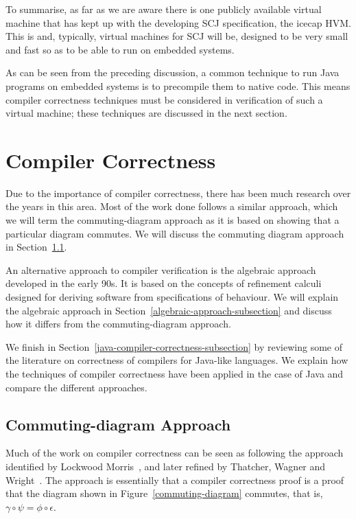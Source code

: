 \documentclass[a4paper,10pt]{report}
\begin{document}
To summarise, as far as we are aware there is one publicly available
virtual machine that has kept up with the developing SCJ
specification, the icecap HVM.
This is and, typically, virtual machines for SCJ will be, designed to
be very small and fast so as to be able to run on embedded systems.

As can be seen from the preceding discussion, a common technique to
run Java programs on embedded systems is to precompile them to native
code.
This means compiler correctness techniques must be considered in
verification of such a virtual machine; these techniques are discussed
in the next section.

\section{Compiler Correctness}
\label{compiler-correctness-section}

Due to the importance of compiler correctness, there has been much
research over the years in this area.
Most of the work done follows a similar approach, which we will term
the commuting-diagram approach as it is based on showing that a
particular diagram commutes.
We will discuss the commuting diagram approach in
Section~\ref{commuting-diagram-subsection}.

An alternative approach to compiler verification is the algebraic
approach developed in the early 90s.
It is based on the concepts of refinement calculi designed for
deriving software from specifications of behaviour.
We will explain the algebraic approach in
Section~\ref{algebraic-approach-subsection} and discuss how it differs
from the commuting-diagram approach.

We finish in Section~\ref{java-compiler-correctness-subsection} by
reviewing some of the literature on correctness of compilers for
Java-like languages.
We explain how the techniques of compiler correctness have been
applied in the case of Java and compare the different approaches.

\subsection{Commuting-diagram Approach}
\label{commuting-diagram-subsection}

Much of the work on compiler correctness can be seen as following the
approach identified by Lockwood Morris~\cite{morris1973}, and later
refined by Thatcher, Wagner and Wright~\cite{thatcher1979}.
The approach is essentially that a compiler correctness proof is a
proof that the diagram shown in Figure~\ref{commuting-diagram}
commutes, that is, $\gamma \circ \psi = \phi \circ \epsilon$.
\end{document}
